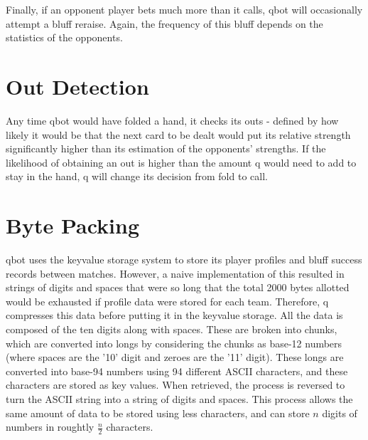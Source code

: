 \documentclass[]{article}
\begin{document}
Finally, if an opponent player bets much more than it calls, qbot will occasionally attempt a bluff reraise. Again, the frequency of this bluff depends on the statistics of the opponents.

\section{Out Detection}

Any time qbot would have folded a hand, it checks its outs - defined by how likely it would be that the next card to be dealt would put its relative strength significantly higher than its estimation of the opponents' strengths. If the likelihood of obtaining an out is higher than the amount q would need to add to stay in the hand, q will change its decision from fold to call.

\section{Byte Packing}

qbot uses the keyvalue storage system to store its player profiles and bluff success records between matches. However, a naive implementation of this resulted in strings of digits and spaces that were so long that the total 2000 bytes allotted would be exhausted if profile data were stored for each team. Therefore, q compresses this data before putting it in the keyvalue storage. All the data is composed of the ten digits along with spaces. These are broken into chunks, which are converted into longs by considering the chunks as base-12 numbers (where spaces are the '10' digit and zeroes are the '11' digit). These longs are converted into base-94 numbers using 94 different ASCII characters, and these characters are stored as key values. When retrieved, the process is reversed to turn the ASCII string into a string of digits and spaces. This process allows the same amount of data to be stored using less characters, and can store $n$ digits of numbers in roughtly $\frac{n}{2}$ characters.
\end{document}
